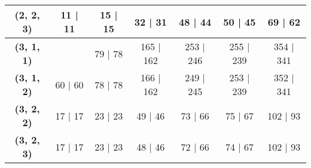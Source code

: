 \documentclass[12pt]{article}
\begin{document}
\begin{table}[H]
\begin{tabular}{|c|c|c|c|c|c|c|}
  \textbf{(2, 2, 3)}            & 11 | 11                                                & \cellcolor[HTML]{F8A102}15 | 15 & 32 | 31                           & \cellcolor[HTML]{F8A102}48 | 44   & \cellcolor[HTML]{F56B00}50 | 45   & 69 | 62                           \\ \hline
  \textbf{(3, 1, 1)}            & \cellcolor[HTML]{F8A102}{\color[HTML]{333333} 61 | 60} & 79 | 78                         & \cellcolor[HTML]{F8A102}165 | 162 & 253 | 246                         & \cellcolor[HTML]{9A0000}255 | 239 & \cellcolor[HTML]{F8A102}354 | 341 \\ \hline
  \textbf{(3, 1, 2)}            & 60 | 60                                                & 78 | 78                         & 166 | 162                         & \cellcolor[HTML]{F56B00}249 | 245 & \cellcolor[HTML]{CB0000}253 | 239 & \cellcolor[HTML]{FE0000}352 | 341 \\ \hline
  \textbf{(3, 2, 2)}            & 17 | 17                                                & 23 | 23                         & 49 | 46                           & \cellcolor[HTML]{F8A102}73 | 66   & 75 | 67                           & \cellcolor[HTML]{F8A102}102 | 93  \\ \hline
  \textbf{(3, 2, 3)}            & 17 | 17                                                & 23 | 23                         & 48 | 46                           & 72 | 66                           & \cellcolor[HTML]{F8A102}74 | 67   & \cellcolor[HTML]{F8A102}102 | 93  \\ \hline
  \end{tabular}
  \end{table}
\end{document}
